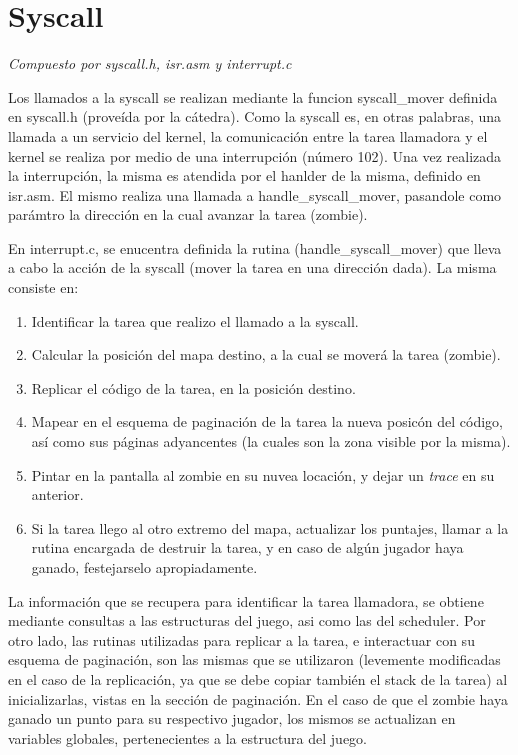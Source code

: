 \documentclass{article}
\begin{document}
	\section{Syscall}
	\vspace{-1cm}
	\begin{flushright}
		\textit{Compuesto por syscall.h, isr.asm y interrupt.c}
	\end{flushright}
    Los llamados a la syscall se realizan mediante la funcion syscall\_mover definida en syscall.h
    (proveída por la cátedra). Como la syscall es, en otras palabras, una llamada a un servicio del
    kernel, la comunicación entre la tarea llamadora y el kernel se realiza por medio de una
    interrupción (número 102). Una vez realizada la interrupción, la misma es atendida por el
    hanlder de la misma, definido en isr.asm. El mismo realiza una llamada a handle\_syscall\_mover,
    pasandole como parámtro la dirección en la cual avanzar la tarea (zombie).

    En interrupt.c, se enucentra definida la rutina (handle\_syscall\_mover) que lleva a cabo la acción de la syscall (mover
    la tarea en una dirección dada). La misma consiste en:
    \begin{enumerate}
        \item Identificar la tarea que realizo el llamado a la syscall.
        \item Calcular la posición del mapa destino, a la cual se moverá la tarea (zombie).
        \item Replicar el código de la tarea, en la posición destino.
        \item Mapear en el esquema de paginación de la tarea la nueva posicón del código, así como
            sus páginas adyancentes (la cuales son la zona visible por la misma).
        \item Pintar en la pantalla al zombie en su nuvea locación, y dejar un \textit{trace} en su
            anterior.
        \item Si la tarea llego al otro extremo del mapa, actualizar los puntajes, llamar a la
            rutina encargada de destruir la tarea, y en caso de algún jugador haya ganado,
            festejarselo apropiadamente.
    \end{enumerate}
    
    La información que se recupera para identificar la tarea llamadora, se obtiene mediante
    consultas a las estructuras del juego, asi como las del scheduler. Por otro lado, las rutinas
    utilizadas para replicar a la tarea, e interactuar con su esquema de paginación, son las mismas
    que se utilizaron (levemente modificadas en el caso de la replicación, ya que se debe copiar
    también el stack de la tarea) al inicializarlas, vistas en la sección de paginación. En el caso
    de que el zombie haya ganado un punto para su respectivo jugador, los mismos se actualizan en
    variables globales, pertenecientes a la estructura del juego.
\end{document}
